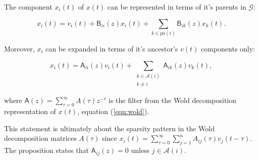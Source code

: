 \documentclass[12pt]{article}
\def\gcg{\mathcal{G}}  %
\def\B{\mathsf{B}}  %
\def\wtB{\widetilde{\B}}  %
\def\A{\mathsf{A}}  %
\newcommand{\pa}[1]{pa(#1)}  %
\newcommand{\anc}[1]{\mathcal{A}(#1)}  %
\newcommand{\ancn}[2]{\mathcal{A}_{#1}(#2)}  %
\newcommand{\gpn}[2]{gp_{#1}(#2)}  %
\begin{document}

\begin{proposition}
  \label{prop:parent_expanding}
  The component $x_i(t)$ of $x(t)$ can be represented in terms of it's
  parents in $\gcg$:

  \begin{equation}
    \label{eqn:parent_expansion}
    x_i(t) = v_i(t) + \B_{ii}(z)x_i(t) + \sum_{k \in \pa{i}}\B_{ik}(z)x_k(t).
  \end{equation}

  Moreover, $x_i$ can be expanded in terms of it's ancestor's $v(t)$
  components only:

  \begin{equation}
    \label{eqn:ancestor_expansion}
    x_i(t) = \A_{ii}(z)v_i(t) + \sum_{\substack{k \in \anc{i} \\ k \ne i}}\A_{ik}(z)v_k(t),
  \end{equation}

  where $\A(z) = \sum_{\tau = 0}^\infty A(\tau)z^{-\tau}$ is the filter from
  the Wold decomposition representation of $x(t)$, equation
  (\ref{eqn:wold}).
\end{proposition}

This statement is ultimately about the sparsity pattern in the Wold
decomposition matrices $A(\tau)$ since
$x_i(t) = \sum_{\tau = 0}^\infty \sum_{j = 1}^n A_{ij}(\tau)v_j(t -
\tau)$.  The proposition states that $\A_{ij}(z) = 0$ unless
$j \in \anc{i}$.



\end{document}
